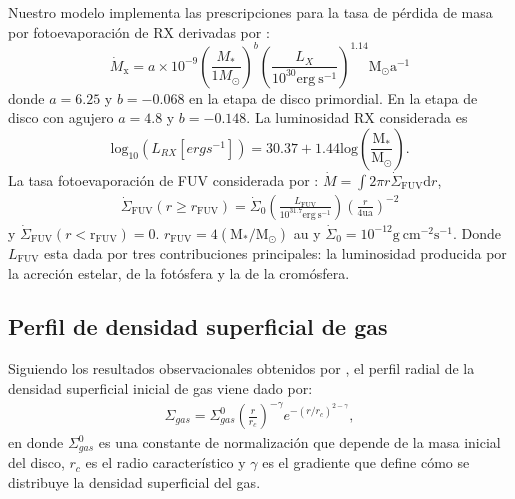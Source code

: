 \documentclass[baaa]{baaa}
\begin{document}
Nuestro modelo implementa las prescripciones para la tasa de p\'erdida de masa por fotoevaporaci\'on de RX derivadas por \citet{owen2010implementationfoto}:
    \begin{equation}
        \dot{M}_{\mathrm{x}}= a\times 10 ^{-9}\left(\frac{M_{*}}{1M_{\odot}}\right)^{ b} %
     \left(\frac{L_X}{10^{30} \mathrm{erg}~\mathrm{s}^{-1}} \right)^{1.14}\mathrm{M}_{\odot}\mathrm{a}^{-1}
    \label{eq:Mpunto}
    \end{equation}
donde $a=6.25$ y $b=-0.068$ en la etapa de disco primordial. En la etapa de disco con agujero $a=4.8$ y $b=-0.148$. La luminosidad RX considerada es
\begin{equation}
    \mathrm{log}_{10}(L_{RX}[ergs^{-1}]) = 30.37 + 1.44\mathrm{log}\left( \frac{\mathrm{M}_{*}}{\mathrm{M}_{\odot}}\right).
    \label{ec:lum_RX}
\end{equation}
La tasa fotoevaporaci\'on de FUV considerada por \citet{kunitoma2021tasas}: $\dot{M} = \int 2 \pi r \dot{\Sigma}_{\mathrm{FUV}}\mathrm{d}r$,
\begin{align}
    \dot{\Sigma}_{\mathrm{FUV}}(r\geq r _{\mathrm{FUV}}) = \dot{\Sigma}_{0} \left( \frac{L _{\mathrm{FUV}}}{10^{31.7}\mathrm{erg}~\mathrm{s}^{-1}} \right) \left( \frac{r}{4\text{ua}} \right)^{-2}
\end{align}
y $\dot{ \Sigma }_{ \mathrm{FUV} }(r<\mathrm{r}_{\mathrm{FUV}}) = 0$. $r_{\mathrm{FUV}} = 4 (\mathrm{M}_*/ \mathrm{M}_{\odot})$ au y $\dot{\Sigma}_{0} = 10^{-12}\mathrm{g}~\mathrm{cm}^{-2}\text{s}^{-1}$. Donde $L_{\mathrm{FUV}}$ esta dada por tres contribuciones principales: la luminosidad producida por la acreción estelar, de la fot\'osfera y la de la crom\'osfera.


\subsection{Perfil de densidad superficial de gas}

Siguiendo los resultados observacionales obtenidos por \cite{Andrews_2010}, el perfil radial de la densidad superficial inicial de gas viene dado por:
\begin{align}
    \Sigma_{gas} = \Sigma_{gas}^{0} \left(\frac{r}{r_c}\right)^{-\gamma} e^{-(r/r_c)^{2-\gamma}},
    \label{eq:densi_inicial}
\end{align}
en donde $\Sigma_{gas}^{0}$ es una constante de normalización que depende de la masa inicial del disco, $r_{c}$ es el radio característico y $\gamma$ es el gradiente que define c\'omo se distribuye la densidad superficial del gas.
\end{document}
